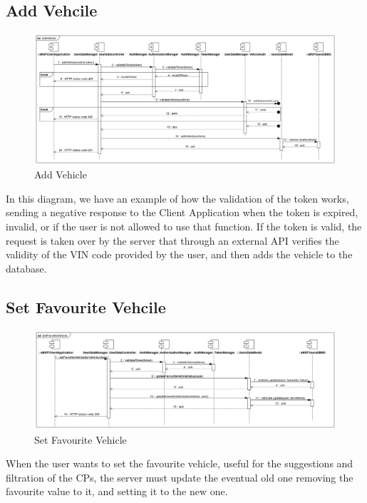 \documentclass{Configuration_Files/PoliMi3i_thesis}
\begin{document}
\subsection{Add Vehcile}
\begin{figure}[H]
    \centering
    \includegraphics[width=1\textwidth]{Images/sequenceDiagrams/addVehicle.jpg}
    \caption{Add Vehicle}
\end{figure}
In this diagram, we have an example of how the validation of the token works, sending a negative response to the Client Application when the token is expired, invalid, or if the user is not allowed to use that function.
If the token is valid, the request is taken over by the server that through an external API verifies the validity of the VIN code provided by the user, and then adds the vehicle to the database.

\subsection{Set Favourite Vehcile}
\begin{figure}[H]
    \centering
    \includegraphics[width=1\textwidth]{Images/sequenceDiagrams/setFavoriteVehicle.jpg}
    \caption{Set Favourite Vehicle}
\end{figure}
When the user wants to set the favourite vehicle, useful for the suggestions and filtration of the CPs, the server must update the eventual old one removing the favourite value to it, and setting it to the new one.
\end{document}
